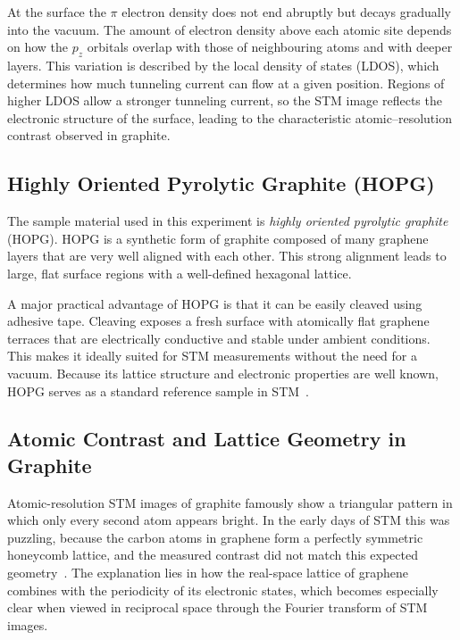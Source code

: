 \documentclass[a4paper]{article}
\begin{document}
At the surface the $\pi$ electron density does not end abruptly but decays gradually into the vacuum.
The amount of electron density above each atomic site depends on how the $p_z$ orbitals overlap with those of neighbouring atoms and with deeper layers.
This variation is described by the local density of states (LDOS), which determines how much tunneling current can flow at a given position.
Regions of higher LDOS allow a stronger tunneling current, so the STM image reflects the electronic structure of the surface, leading to the characteristic atomic–resolution contrast observed in graphite.

\subsection{Highly Oriented Pyrolytic Graphite (HOPG)}

The sample material used in this experiment is \emph{highly oriented pyrolytic graphite} (HOPG).
HOPG is a synthetic form of graphite composed of many graphene layers that are very well aligned with each other.
This strong alignment leads to large, flat surface regions with a well-defined hexagonal lattice.

A major practical advantage of HOPG is that it can be easily cleaved using adhesive tape.
Cleaving exposes a fresh surface with atomically flat graphene terraces that are electrically conductive and stable under ambient conditions.
This makes it ideally suited for STM measurements without the need for a vacuum.
Because its lattice structure and electronic properties are well known, HOPG serves as a standard reference sample in STM~\cite{spmtips_hopg}.

\subsection{Atomic Contrast and Lattice Geometry in Graphite}\label{sec:atomic_constrast}

Atomic-resolution STM images of graphite famously show a triangular pattern in which only every second atom appears bright.
In the early days of STM this was puzzling, because the carbon atoms in graphene form a perfectly symmetric honeycomb lattice, and the measured contrast did not match this expected geometry~\cite{atamny1999pccp}.
The explanation lies in how the real-space lattice of graphene combines with the periodicity of its electronic states, which becomes especially clear when viewed in reciprocal space through the Fourier transform of STM images.
\end{document}
